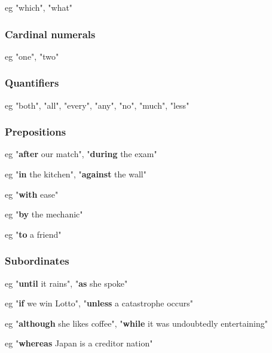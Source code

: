 eg "which", "what"

\subsubsection{Cardinal numerals}

eg "one", "two"

\subsubsection{Quantifiers}

eg "both", "all", "every", "any", "no", "much", "less"

\subsubsection{Prepositions}



eg "\textbf{after} our match", "\textbf{during} the exam"



eg "\textbf{in} the kitchen", "\textbf{against} the wall"



eg "\textbf{with} ease"



eg "\textbf{by} the mechanic"



eg "\textbf{to} a friend"

\subsubsection{Subordinates}



eg "\textbf{until} it rains", "\textbf{as} she spoke"



eg "\textbf{if} we win Lotto", "\textbf{unless} a catastrophe occurs"



eg "\textbf{although} she likes coffee", "\textbf{while} it was undoubtedly entertaining"



eg "\textbf{whereas} Japan is a creditor nation"



